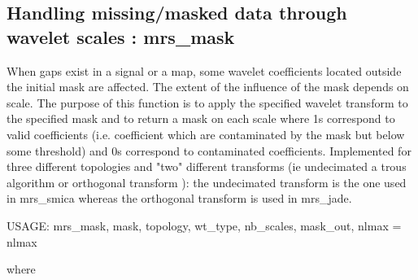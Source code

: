 \subsection{Handling missing/masked data through wavelet scales : mrs\_mask}
When gaps exist in a signal or a map, some wavelet coefficients located outside the initial mask are affected. The extent of 
the influence of the mask depends on scale. The purpose of this function is to apply the specified wavelet transform to the 
specified mask and to return a mask on each scale where 1s correspond to valid coefficients (i.e. coefficient which are 
contaminated by the mask but below some threshold) and 0s correspond to contaminated coefficients. Implemented for three 
different topologies and "two" different transforms (ie undecimated a trous algorithm or orthogonal transform ): the undecimated 
transform is the one used in mrs\_smica whereas the orthogonal transform is used in mrs\_jade.
{\bf
\begin{center}
     USAGE: mrs\_mask, mask, topology, wt\_type, nb\_scales, mask\_out, nlmax = nlmax
\end{center}}
where
